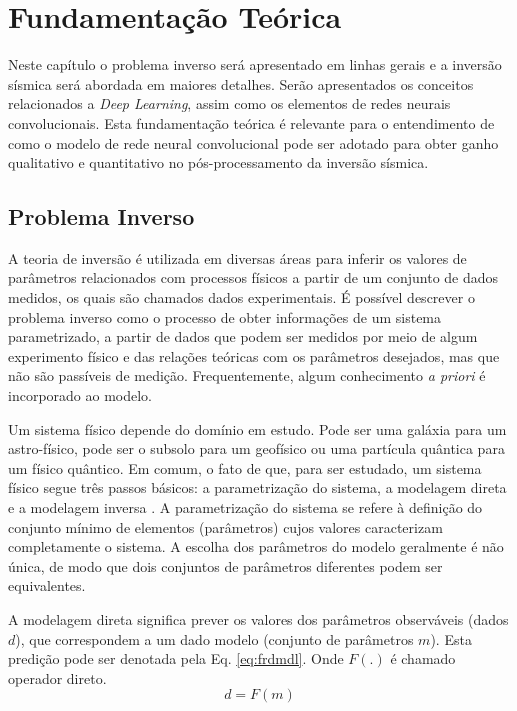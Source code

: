 \chapter{Fundamentação Teórica}
\label{cap:2fundamentacao}
Neste capítulo o problema inverso será apresentado
em linhas gerais e a inversão sísmica será abordada em maiores detalhes.
Serão apresentados os conceitos relacionados a \textit{Deep Learning}, assim como os
elementos de redes neurais convolucionais. Esta fundamentação
teórica é relevante para o entendimento de como o modelo de rede neural convolucional
pode ser adotado para obter ganho qualitativo e quantitativo no pós-processamento
da inversão sísmica.

\section{Problema Inverso}
A teoria de inversão é utilizada em diversas áreas para inferir os valores de
parâmetros relacionados com processos físicos a partir de um conjunto de dados medidos,
os quais são chamados dados experimentais. É possível descrever o problema inverso
como o processo de obter informações de um sistema parametrizado, a partir de
dados que podem ser medidos por meio de algum experimento físico e das relações teóricas com os parâmetros
desejados, mas que não são passíveis de medição. Frequentemente, algum conhecimento \textit{a priori}
é incorporado ao modelo.

Um sistema físico depende do domínio em estudo. Pode ser uma galáxia para um
astro-físico, pode ser o subsolo para um geofísico ou uma partícula quântica
para um físico quântico. Em comum, o fato de que, para ser estudado, um sistema
físico segue três passos básicos: a parametrização do sistema, a modelagem direta e a modelagem inversa \citep{tarantola}.
A parametrização do sistema se refere à definição do conjunto mínimo de elementos (parâmetros)
cujos valores caracterizam completamente o sistema. A escolha dos parâmetros do modelo geralmente
é não única, de modo que dois conjuntos de parâmetros diferentes podem ser equivalentes.

A modelagem direta significa prever os valores dos parâmetros observáveis (dados $d$),
que correspondem a um dado modelo (conjunto de parâmetros $m$). Esta predição pode ser denotada
pela Eq. \ref{eq:frdmdl}. Onde $F(.)$ é chamado operador direto.
\begin{equation}
\label{eq:frdmdl}
d = F(m) 
\end{equation}

